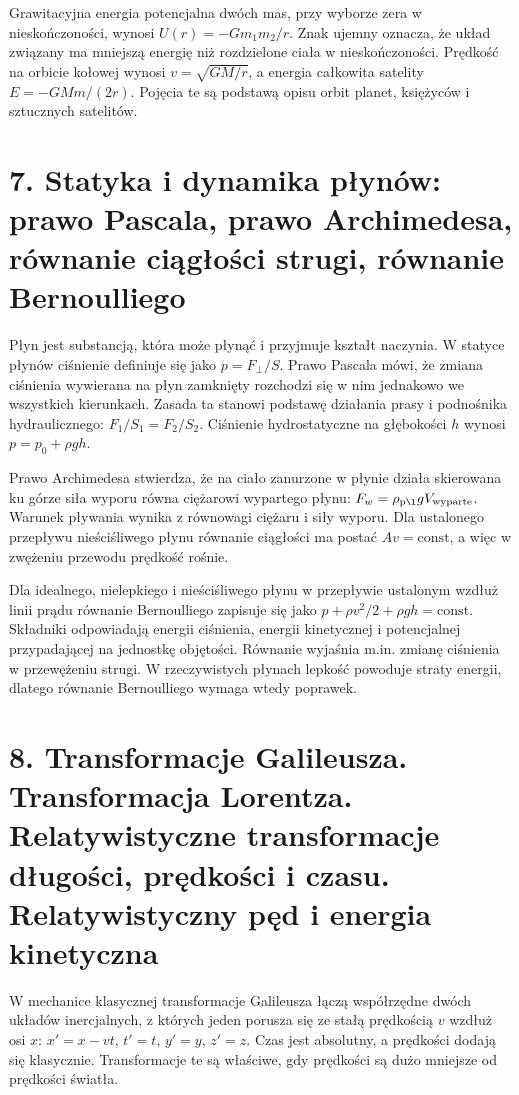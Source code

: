 \documentclass[11pt,a4paper,oneside]{report}
\begin{document}
Grawitacyjna energia potencjalna dwóch mas, przy wyborze zera w nieskończoności, wynosi \(U(r)=-Gm_1m_2/r\). Znak ujemny oznacza, że układ związany ma mniejszą energię niż rozdzielone ciała w nieskończoności. Prędkość na orbicie kołowej wynosi \(v=\sqrt{GM/r}\), a energia całkowita satelity \(E=-GMm/(2r)\). Pojęcia te są podstawą opisu orbit planet, księżyców i sztucznych satelitów.

\section{7. Statyka i dynamika płynów: prawo Pascala, prawo Archimedesa, równanie ciągłości strugi, równanie Bernoulliego}
Płyn jest substancją, która może płynąć i przyjmuje kształt naczynia. W statyce płynów ciśnienie definiuje się jako \(p=F_\perp/S\). Prawo Pascala mówi, że zmiana ciśnienia wywierana na płyn zamknięty rozchodzi się w nim jednakowo we wszystkich kierunkach. Zasada ta stanowi podstawę działania prasy i podnośnika hydraulicznego: \(F_1/S_1=F_2/S_2\). Ciśnienie hydrostatyczne na głębokości \(h\) wynosi \(p=p_0+\rho gh\).

Prawo Archimedesa stwierdza, że na ciało zanurzone w płynie działa skierowana ku górze siła wyporu równa ciężarowi wypartego płynu: \(F_w=\rho_{\rm pł}gV_{\rm wyparte}\). Warunek pływania wynika z równowagi ciężaru i siły wyporu. Dla ustalonego przepływu nieściśliwego płynu równanie ciągłości ma postać \(Av=\mathrm{const}\), a więc w zwężeniu przewodu prędkość rośnie.

Dla idealnego, nielepkiego i nieściśliwego płynu w przepływie ustalonym wzdłuż linii prądu równanie Bernoulliego zapisuje się jako \(p+\rho v^2/2+\rho gh=\mathrm{const}\). Składniki odpowiadają energii ciśnienia, energii kinetycznej i potencjalnej przypadającej na jednostkę objętości. Równanie wyjaśnia m.in. zmianę ciśnienia w przewężeniu strugi. W rzeczywistych płynach lepkość powoduje straty energii, dlatego równanie Bernoulliego wymaga wtedy poprawek.

\section{8. Transformacje Galileusza. Transformacja Lorentza. Relatywistyczne transformacje długości, prędkości i czasu. Relatywistyczny pęd i energia kinetyczna}
W mechanice klasycznej transformacje Galileusza łączą współrzędne dwóch układów inercjalnych, z których jeden porusza się ze stałą prędkością \(v\) wzdłuż osi \(x\): \(x'=x-vt\), \(t'=t\), \(y'=y\), \(z'=z\). Czas jest absolutny, a prędkości dodają się klasycznie. Transformacje te są właściwe, gdy prędkości są dużo mniejsze od prędkości światła.
\end{document}
